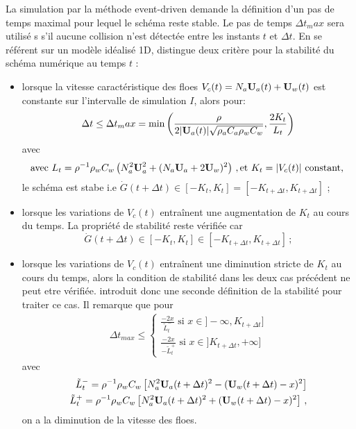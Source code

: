 La simulation par la méthode event-driven demande la définition d'un pas de temps maximal pour lequel le schéma reste stable. Le pas de temps $\Delta t_max$ sera utilisé s
s'il aucune collision n'est détectée entre les instants $t$ et $\Delta t$. En se référent sur un modèle idéalisé 1D, \citeauthor{rabatel2015thesis} distingue deux critère pour la stabilité du schéma numérique au temps $t$ :
\begin{itemize}
    \item lorsque la vitesse caractéristique des floes $V_c(t) = N_a \bm{\mathrm{U}}_a(t) + \bm{\mathrm{U}}_w(t)$ est constante sur l'intervalle de simulation $I$, alors pour:  
    \begin{align} \label{eq:dtmax1}
        \Delta t \leq \Delta t_max = \min{ \left(\frac{\rho}{2 \vert \bm{\mathrm{U}}_a(t) \vert \sqrt{\rho_a C_a \rho_w C_w}},   \frac{2K_t}{L_t} \right)}
    \end{align}
    avec 
    $$
    \text{avec } L_t = \rho^{-1} \rho_w C_w \left( N_a^2 \bm{\mathrm{U}}_a^2 + (N_a\bm{\mathrm{U}}_a + 2 \bm{\mathrm{U}}_w)^2 \right) \,, \text{et } K_t = \vert V_c(t) \vert \text{ constant, }
    $$
    le schéma est stabe i.e $\dot G (t + \Delta t) \in [-K_t, K_t] = [-K_{t + \Delta t}, K_{t + \Delta t}]$ ;
    \item lorsque les variations de $V_c(t)$ entraînent une augmentation de $K_t$ au cours du temps. La propriété de stabilité reste vérifiée car $$\dot G (t + \Delta t) \in [-K_t, K_t] \in [-K_{t + \Delta t}, K_{t + \Delta t}] \,;$$
    \item lorsque les variations de $V_c(t)$ entraînent une diminution stricte
    de $K_t$ au cours du temps, alors la condition de stabilité dans les deux cas précédent ne peut etre vérifiée. \citeauthor{rabatel2015thesis} introduit donc une seconde définition de la stabilité pour traiter ce cas. Il remarque que pour 
    \begin{align} \label{eq:dtmax2}
    \Delta t_{max} \leq \begin{cases}
        \frac{-2x}{\tilde{L}_t^{-}} \text{  si  } x \in  ]-\infty, K_{t+\Delta t}] \\
        \frac{-2x}{-\tilde{L}_t^{+}} \text{  si  } x \in  ]K_{t+\Delta t}, +\infty]
    \end{cases}\end{align}
    avec \begin{align*} \tilde{L}_t^{-} =  \rho^{-1} \rho_w C_w \left[ N_a^2 \bm{\mathrm{U}}_a(t+\Delta t)^2 - (\bm{\mathrm{U}}_w(t + \Delta t) - x)^2 \right] \\ \tilde{L}_t^{+} =  \rho^{-1} \rho_w C_w \left[ N_a^2 \bm{\mathrm{U}}_a(t+\Delta t)^2 + (\bm{\mathrm{U}}_w(t + \Delta t) - x)^2 \right] \,,
     \end{align*}
    on a la diminution de la vitesse des floes.
\end{itemize} 
